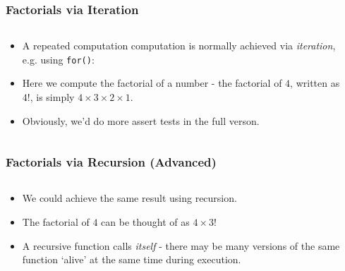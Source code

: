 
\begin{frame}[fragile]
\frametitle{Factorials via Iteration}
\begin{columns}

\begin{column}{0.60\textwidth}
\begin{itemize}[<+->]
\item A repeated computation computation is normally
achieved via {\it iteration}, e.g. using \verb^for()^:
\item Here we compute the factorial of a number - the factorial of
$4$, written as $4!$, is simply $4\times3\times2\times1$.
\item Obviously, we'd do more assert tests in the full verson.
\end{itemize}
\end{column}

\begin{column}{0.35\textwidth}

\end{column}

\end{columns}
\end{frame}


\begin{frame}[fragile]
\frametitle{Factorials via Recursion (Advanced)}
\begin{columns}

\begin{column}{0.60\textwidth}
\begin{itemize}[<+->]
\item We could achieve the same result using recursion.
\item The factorial of $4$ can be thought of as $4\times3!$
\item A recursive function calls {\it itself} - there may be many versions of the same function `alive' at the same time during execution.
\end{itemize}
\end{column}

\begin{column}{0.35\textwidth}

\end{column}

\end{columns}
\end{frame}


